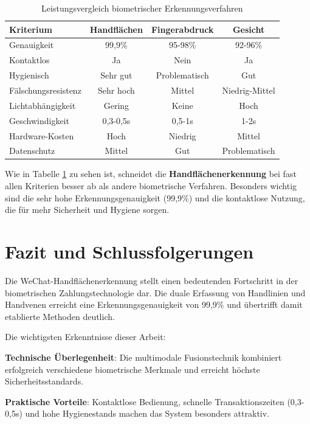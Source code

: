 \documentclass[paper=a4,fontsize=12pt,ngerman]{scrartcl}
\begin{document}
\begin{table}[!htb]
\centering
\begin{tabular}{|l|c|c|c|}
\hline
\textbf{Kriterium} & \textbf{Handflächen} & \textbf{Fingerabdruck} & \textbf{Gesicht} \\
\hline
Genauigkeit & 99,9\% & 95-98\% & 92-96\% \\
\hline
Kontaktlos & Ja & Nein & Ja \\
\hline
Hygienisch & Sehr gut & Problematisch & Gut \\
\hline
Fälschungsresistenz & Sehr hoch & Mittel & Niedrig-Mittel \\
\hline
Lichtabhängigkeit & Gering & Keine & Hoch \\
\hline
Geschwindigkeit & 0,3-0,5s & 0,5-1s & 1-2s \\
\hline
Hardware-Kosten & Hoch & Niedrig & Mittel \\
\hline
Datenschutz & Mittel & Gut & Problematisch \\
\hline
\end{tabular}
\caption{Leistungsvergleich biometrischer Erkennungsverfahren}
\label{tab:biometric-comparison}
\end{table}

Wie in Tabelle \ref{tab:biometric-comparison} zu sehen ist, schneidet die \textbf{Handflächenerkennung} bei fast allen Kriterien besser ab als andere biometrische Verfahren. Besonders wichtig sind die sehr hohe Erkennungsgenauigkeit (99,9\%) und die kontaktlose Nutzung, die für mehr Sicherheit und Hygiene sorgen.


\vspace{2cm}

\section{Fazit und Schlussfolgerungen}
Die WeChat-Handflächenerkennung stellt einen bedeutenden Fortschritt in der biometrischen Zahlungstechnologie dar. Die duale Erfassung von Handlinien und Handvenen erreicht eine Erkennungsgenauigkeit von 99,9\% und übertrifft damit etablierte Methoden deutlich.

Die wichtigsten Erkenntnisse dieser Arbeit:

\textbf{Technische Überlegenheit}: Die multimodale Fusionstechnik kombiniert erfolgreich verschiedene biometrische Merkmale und erreicht höchste Sicherheitsstandards.

\textbf{Praktische Vorteile}: Kontaktlose Bedienung, schnelle Transaktionszeiten (0,3-0,5s) und hohe Hygienestands machen das System besonders attraktiv.
\end{document}
